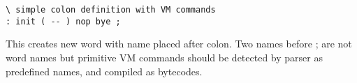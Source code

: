 \clearpage{}

\begin{lstlisting}[language=Forth]
\ simple colon definition with VM commands
: init ( -- ) nop bye ;
\end{lstlisting}

\noindent This  creates new word with name placed after
colon. Two names before ; are not word names but primitive VM commands should be
detected by parser as predefined names, and compiled as bytecodes.
